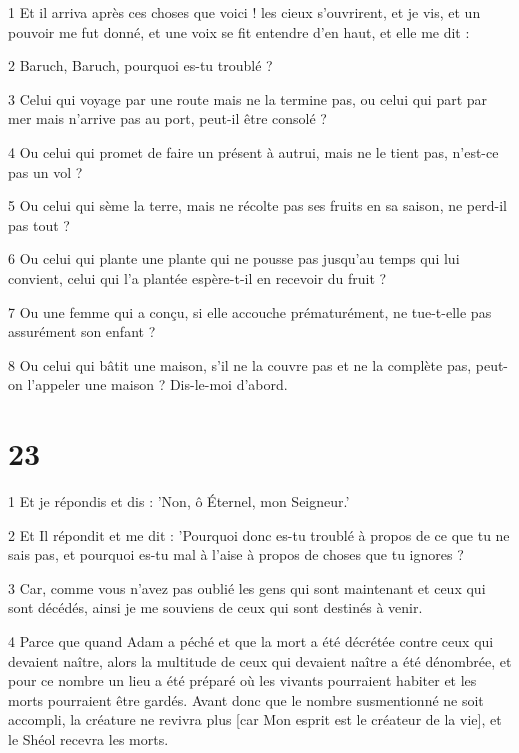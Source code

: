 \par 1 Et il arriva après ces choses que voici ! les cieux s'ouvrirent, et je vis, et un pouvoir me fut donné, et une voix se fit entendre d'en haut, et elle me dit :

\par 2 Baruch, Baruch, pourquoi es-tu troublé ?

\par 3 Celui qui voyage par une route mais ne la termine pas, ou celui qui part par mer mais n'arrive pas au port, peut-il être consolé ?

\par 4 Ou celui qui promet de faire un présent à autrui, mais ne le tient pas, n'est-ce pas un vol ?

\par 5 Ou celui qui sème la terre, mais ne récolte pas ses fruits en sa saison, ne perd-il pas tout ?

\par 6 Ou celui qui plante une plante qui ne pousse pas jusqu'au temps qui lui convient, celui qui l'a plantée espère-t-il en recevoir du fruit ?

\par 7 Ou une femme qui a conçu, si elle accouche prématurément, ne tue-t-elle pas assurément son enfant ?

\par 8 Ou celui qui bâtit une maison, s'il ne la couvre pas et ne la complète pas, peut-on l'appeler une maison ? Dis-le-moi d’abord.

\chapter{23}

\par 1 Et je répondis et dis : 'Non, ô Éternel, mon Seigneur.'

\par 2 Et Il répondit et me dit : 'Pourquoi donc es-tu troublé à propos de ce que tu ne sais pas, et pourquoi es-tu mal à l'aise à propos de choses que tu ignores ?

\par 3 Car, comme vous n'avez pas oublié les gens qui sont maintenant et ceux qui sont décédés, ainsi je me souviens de ceux qui sont destinés à venir.

\par 4 Parce que quand Adam a péché et que la mort a été décrétée contre ceux qui devaient naître, alors la multitude de ceux qui devaient naître a été dénombrée, et pour ce nombre un lieu a été préparé où les vivants pourraient habiter et les morts pourraient être gardés. Avant donc que le nombre susmentionné ne soit accompli, la créature ne revivra plus [car Mon esprit est le créateur de la vie], et le Shéol recevra les morts.

